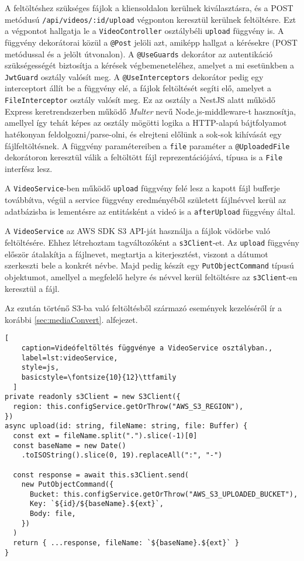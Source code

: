 A feltöltéshez szükséges fájlok a kliensoldalon kerülnek kiválasztásra, és a POST metódusú \verb|/api/videos/:id/upload| végponton keresztül kerülnek feltöltésre. Ezt a végpontot hallgatja le a \verb|VideoController| osztálybéli \verb|upload| függvény is. A függvény dekorátorai közül a \verb|@Post| jelöli azt, amiképp hallgat a kérésekre (POST metódussal és a jelölt útvonalon). A \verb|@UseGuards| dekorátor az autentikáció szükségességét biztosítja a kérések végbemeneteléhez, amelyet a mi esetünkben a \verb|JwtGuard| osztály valósít meg. A \verb|@UseInterceptors| dekorátor pedig egy interceptort állít be a függvény elé, a fájlok feltöltését segíti elő, amelyet a \verb|FileInterceptor| osztály valósít meg. Ez az osztály a NestJS alatt működő Express keretrendszerben működő \emph{Multer} nevű Node.js-middleware-t hasznosítja, amellyel így tehát képes az osztály mögötti logika a HTTP-alapú bájtfolyamot hatékonyan feldolgozni/parse-olni, és elrejteni előlünk a sok-sok kihívását egy fájlfeltöltésnek. A függvény paramétereiben a \verb|file| paraméter a \verb|@UploadedFile| dekorátoron keresztül válik a feltöltött fájl reprezentációjává, típusa is a \verb|File| interfész lesz.

A \verb|VideoService|-ben működő \verb|upload| függvény felé lesz a kapott fájl bufferje továbbítva, végül a service függvény eredményéből született fájlnévvel kerül az adatbázisba is lementésre az entitásként a videó is a \verb|afterUpload| függvény által.

A \verb|VideoService| az AWS SDK S3 API-ját használja a fájlok vödörbe való feltöltésére. Ehhez létrehoztam tagváltozóként a \verb|s3Client|-et. Az \verb|upload| függvény először átalakítja a fájlnevet, megtartja a kiterjesztést, viszont a dátumot szerkeszti bele a konkrét névbe. Majd pedig készít egy \verb|PutObjectCommand| típusú objektumot, amellyel a megfelelő helyre és névvel kerül feltöltésre az \verb|s3Client|-en keresztül a fájl.

Az ezután történő S3-ba való feltöltésből származó események kezeléséről ír a korábbi \ref{sec:mediaConvert}. alfejezet.

\begin{minipage}{0.92\textwidth}
  \begin{lstlisting}[
    caption=Videófeltöltés függvénye a VideoService osztályban.,
    label=lst:videoService,
    style=js,
    basicstyle=\fontsize{10}{12}\ttfamily
  ]
private readonly s3Client = new S3Client({
  region: this.configService.getOrThrow("AWS_S3_REGION"),
})
async upload(id: string, fileName: string, file: Buffer) {
  const ext = fileName.split(".").slice(-1)[0]
  const baseName = new Date()
    .toISOString().slice(0, 19).replaceAll(":", "-")

  const response = await this.s3Client.send(
    new PutObjectCommand({
      Bucket: this.configService.getOrThrow("AWS_S3_UPLOADED_BUCKET"),
      Key: `${id}/${baseName}.${ext}`,
      Body: file,
    })
  )
  return { ...response, fileName: `${baseName}.${ext}` }
}
\end{lstlisting}
\end{minipage}
